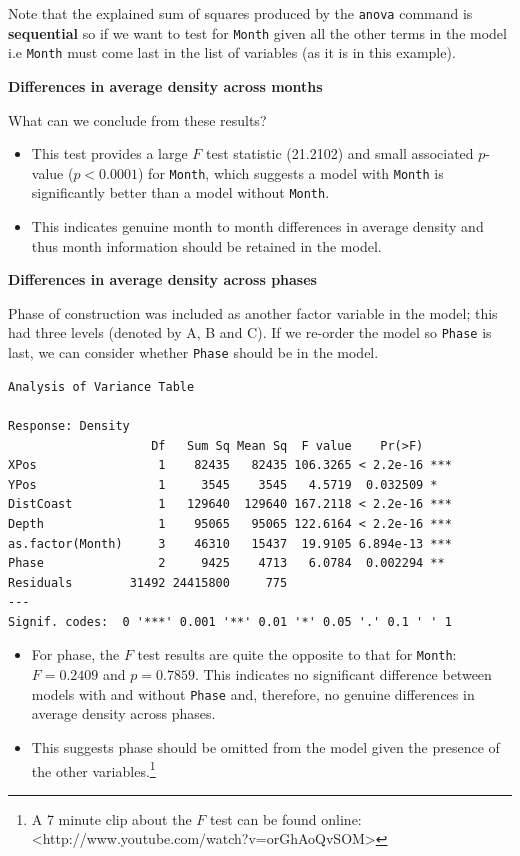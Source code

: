 \documentclass[
  oneside]{krantz}
\providecommand{\tightlist}{%
  \setlength{\itemsep}{0pt}\setlength{\parskip}{0pt}}
\begin{document}
Note that the explained sum of squares produced by the \texttt{anova} command is \textbf{sequential} so if we want to test for \texttt{Month} given all the other terms in the model i.e \texttt{Month} must come last in the list of variables (as it is in this example).

\textbf{Differences in average density across months}

What can we conclude from these results?

\begin{itemize}
\tightlist
\item
  This test provides a large \(F\) test statistic (21.2102) and small associated \(p\)-value (\(p<0.0001\)) for \texttt{Month}, which suggests a model with \texttt{Month} is significantly better than a model without \texttt{Month}.
\item
  This indicates genuine month to month differences in average density and thus month information should be retained in the model.
\end{itemize}

\textbf{Differences in average density across phases}

Phase of construction was included as another factor variable in the model; this had three levels (denoted by A, B and C). If we re-order the model so \texttt{Phase} is last, we can consider whether \texttt{Phase} should be in the model.

\begin{verbatim}
Analysis of Variance Table

Response: Density
                    Df   Sum Sq Mean Sq  F value    Pr(>F)    
XPos                 1    82435   82435 106.3265 < 2.2e-16 ***
YPos                 1     3545    3545   4.5719  0.032509 *  
DistCoast            1   129640  129640 167.2118 < 2.2e-16 ***
Depth                1    95065   95065 122.6164 < 2.2e-16 ***
as.factor(Month)     3    46310   15437  19.9105 6.894e-13 ***
Phase                2     9425    4713   6.0784  0.002294 ** 
Residuals        31492 24415800     775                       
---
Signif. codes:  0 '***' 0.001 '**' 0.01 '*' 0.05 '.' 0.1 ' ' 1
\end{verbatim}

\begin{itemize}
\item
  For phase, the \(F\) test results are quite the opposite to that for \texttt{Month}: \(F=0.2409\) and \(p=0.7859\). This indicates no significant difference between models with and without \texttt{Phase} and, therefore, no genuine differences in average density across phases.
\item
  This suggests phase should be omitted from the model given the presence of the other variables.\footnote{A 7 minute clip about the $F$ test can be found online: \newline <http://www.youtube.com/watch?v=orGhAoQvSOM>}
\end{itemize}
\end{document}

